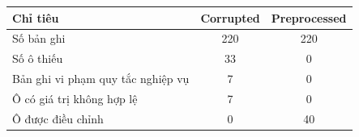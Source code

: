 \begin{tabular}{lcc}
\toprule
Chỉ tiêu & Corrupted & Preprocessed \\
\midrule
Số bản ghi & 220 & 220 \\
Số ô thiếu & 33 & 0 \\
Bản ghi vi phạm quy tắc nghiệp vụ & 7 & 0 \\
Ô có giá trị không hợp lệ & 7 & 0 \\
Ô được điều chỉnh & 0 & 40 \\
\bottomrule
\end{tabular}
